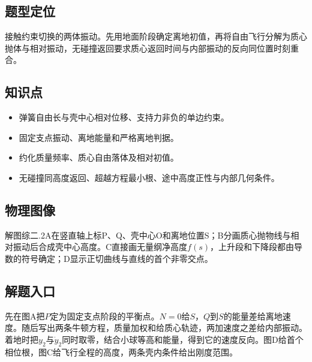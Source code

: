 \documentclass[UTF8,fontset=fandol,a4paper,11pt]{ctexart}
\begin{document}


\subsection*{题型定位}

接触约束切换的两体振动。先用地面阶段确定离地初值，再将自由飞行分解为质心抛体与相对振动，无碰撞返回要求质心返回时间与内部振动的反向同位置时刻重合。



\subsection*{知识点}

\begin{itemize}
\item 弹簧自由长与壳中心相对位移、支持力非负的单边约束。
\item 固定支点振动、离地能量和严格离地判据。
\item 约化质量频率、质心自由落体及相对初值。
\item 无碰撞同高度返回、超越方程最小根、途中高度正性与内部几何条件。
\end{itemize}



\subsection*{物理图像}

解图综二.2A在竖直轴上标P、Q、壳中心O和离地位置S；B分画质心抛物线与相对振动后合成壳中心高度。C直接画无量纲净高度$f(s)$，上升段和下降段都由导数的符号确定；D显示正切曲线与直线的首个非零交点。



\subsection*{解题入口}

先在图A把$P$定为固定支点阶段的平衡点。$N=0$给$S$，$Q$到$S$的能量差给离地速度。随后写出两条牛顿方程，质量加权和给质心轨迹，两加速度之差给内部振动。着地时把$y_2$与$\dot y_2$同时取零，结合小球等高和能量，得到它的速度反向。图D给首个相位根，图C给飞行全程的高度，两条壳内条件给出刚度范围。
\end{document}

